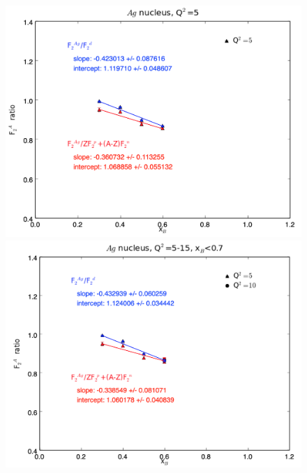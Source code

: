 \documentclass[oneside]{article}
\begin{document}
 \begin{figure}[H]
\begin{minipage}{0.5\textwidth}
 \includegraphics[width=\textwidth]{plots/q2_5/q2_5_Ag.png}
\end{minipage}\hfill\begin{minipage}{0.5\textwidth}
\includegraphics[width=\textwidth]{plots/q2_all_x_l7/q2_all_x_l7_Ag.png}
\end{minipage}\hfill\begin{minipage}{0.5\textwidth}

\end{minipage}
\end{figure}
\end{document}
